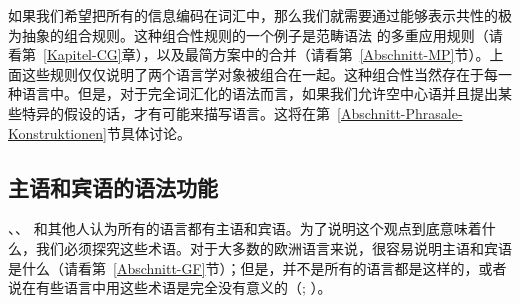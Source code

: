 如果我们希望把所有的信息编码在词汇中，那么我们就需要通过能够表示共性的极为抽象的组合规则。这种组合性规则的一个例子是范畴语法 的多重应用规则（请看第~\ref{Kapitel-CG}章），以及最简方案\indexmp 中的合并（请看第~\ref{Abschnitt-MP}节）。上面这些规则仅仅说明了两个语言学对象被组合在一起。这种组合性当然存在于每一种语言中。但是，对于完全词汇化的语法而言，如果我们允许空中心语并且提出某些特异的假设的话，才有可能来描写语言。这将在第~\ref{Abschnitt-Phrasale-Konstruktionen}节具体讨论。 

\subsection{主语和宾语的语法功能}
\label{Abschnitt-UG-EPP}

\mbox{}\citet[\page xxv]{BK82a}、\citet[--237]{Pinker94a}、\citet[]{Baker2003b} 和其他人认为所有的语言都有主语和宾语。为了说明这个观点到底意味着什么，我们必须探究这些术语。对于大多数的欧洲语言来说，很容易说明主语和宾语是什么（请看第~\ref{Abschnitt-GF}节）；但是，并不是所有的语言都是这样的，或者说在有些语言中用这些术语是完全没有意义的（\citealp[Chapter~4]{Croft2001a}; \citealp[Section~4]{EL2009a}）。

